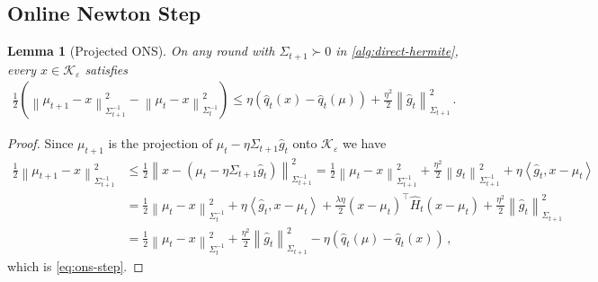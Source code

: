 \documentclass[11pt]{article}
\newtheorem{lemma}[lemma]{Lemma}
\newcommand{\K}{\mathcal K}
\newcommand{\1}{\mathbf 1}
\newcommand{\eps}{\varepsilon}
\newcommand{\ip}[2]{\left\langle #1,#2\right\rangle}
\newcommand{\normm}[2]{\left\lVert #1\right\rVert_{#2}}
\begin{document}
\subsection{Online Newton Step}
\begin{lemma}[Projected ONS]
    \label{lem:ons-step}
    On any round with $\Sigma_{t+1}\succ0$ in
    \cref{alg:direct-hermite}, every $x\in\K_\eps$ satisfies
    \begin{align}
        \frac12
        \left(\normm{\mu_{t+1}-x}{\Sigma_{t+1}^{-1}}^2
        -\normm{\mu_t-x}{\Sigma_t^{-1}}^2\right)
        \leq
        \eta\left(
        \widehat q_t(x)
        -
        \widehat q_t(\mu)
        \right)
        +\frac{\eta^2}{2}\normm{\widehat g_t}{\Sigma_{t+1}}^2
        \,.
        \label{eq:ons-step}
    \end{align}
\end{lemma}
\begin{proof}
    Since $\mu_{t+1}$ is the projection of $\mu_t-\eta\Sigma_{t+1}\widehat g_t$ onto
    $\K_\eps$ we have
    \begin{align}
        \frac12\normm{\mu_{t+1}-x}{\Sigma_{t+1}^{-1}}^2
         & \leq
        \frac12\normm{
            x - (
            \mu_t - \eta\Sigma_{t+1}\widehat g_t)
        }
        {\Sigma_{t+1}^{-1}}^2
        =
        \frac12\normm{\mu_t-x}{\Sigma_{t+1}^{-1}}^2
        +
        \frac{\eta^2}{2}\normm{g_t}{\Sigma_{t+1}^{-1}}^2
        + \eta\ip{\widehat g_t}{x-\mu_t}
        \\
         &
        =\frac12\normm{\mu_t-x}{\Sigma_t^{-1}}^2
        +\eta\ip{\widehat g_t}{x-\mu_t}
        +\frac{\lambda\eta}{2}(x-\mu_t)^\top\widehat H_t(x-\mu_t)
        +\frac{\eta^2}{2}\normm{\widehat g_t}{\Sigma_{t+1}}^2
        \\
         & =
        \frac12\normm{\mu_t-x}{\Sigma_t^{-1}}^2
        +\frac{\eta^2}{2}\normm{\widehat g_t}{\Sigma_{t+1}}^2
        -
        \eta\left(
        \widehat q_t(\mu)
        -
        \widehat q_t(x)
        \right)\,,
    \end{align}
    which is \eqref{eq:ons-step}.
\end{proof}
\end{document}

